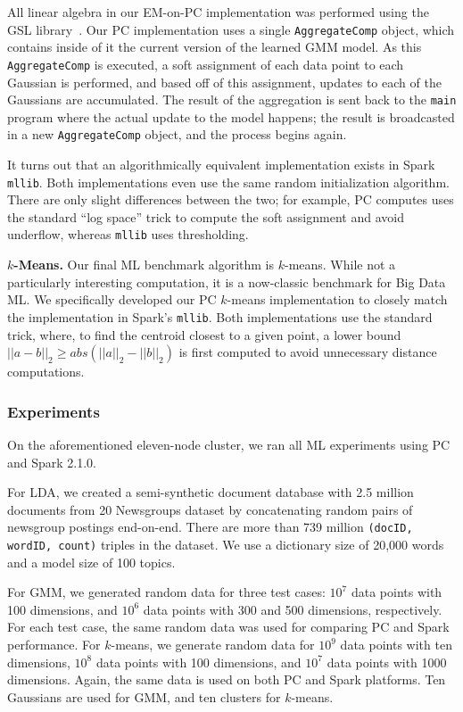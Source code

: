 All linear algebra in our EM-on-PC implementation was performed using
the GSL library~\cite{gsl}.  
Our PC implementation uses a single \texttt{AggregateComp} object, which contains inside of it the current
version of the learned GMM model.  As this  \texttt{AggregateComp} is executed, a soft assignment of each
data point to each Gaussian is performed, and based off of this assignment, updates to each of the Gaussians
are accumulated.  The result of the aggregation is sent back to the \texttt{main} program where the actual update
to the model happens; the result is broadcasted in a new \texttt{AggregateComp} object, and the process begins again.

It turns out that an algorithmically equivalent implementation exists in Spark \texttt{mllib}.
Both implementations even use the same random initialization algorithm.
There are only slight differences between the two; for example, PC computes uses the standard ``log space'' trick to
compute the soft assignment and avoid underflow, whereas \texttt{mllib} uses thresholding.  

\vspace{5pt}
\noindent
\textbf{$k$-Means.} Our final ML benchmark algorithm is $k$-means.  
While not a particularly interesting computation, it is a now-classic
benchmark for Big Data ML.  We specifically developed our PC $k$-means implementation to closely match
the implementation in Spark's \texttt{mllib}.
Both implementations use the standard trick, where, to find the centroid closest to a given point,
a lower bound $||a - b||_2 \geq  abs(||a||_2 - ||b||_2)$ is
first computed to avoid unnecessary distance computations. 

\subsubsection {Experiments}

On the aforementioned eleven-node cluster, 
we ran all ML experiments using PC and Spark 2.1.0.

For LDA,  we
created a semi-synthetic document database with 2.5 million documents from
20 Newsgroups dataset by concatenating random pairs of newsgroup postings
end-on-end. There are more than 739
million \texttt{(docID, wordID, count)} triples in the dataset.
We use a dictionary size
of 20,000 words and a model size of 100 topics. 

For GMM, we generated
random data for three test cases: $10^7$ data
points with 100 dimensions, and $10^6$ data points with 300 and 500
dimensions, respectively. For each test case, the same random data was used
for comparing PC and Spark performance. For $k$-means, we
generate random data for $10^9$ data
points with ten dimensions, $10^8$ data points with 100 dimensions,  and $10^7$
data points with 1000
dimensions. Again, the same data is used on both PC and
Spark platforms.
Ten Gaussians are used for GMM, and ten clusters for $k$-means.


